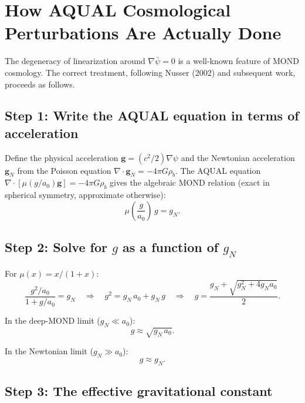 \documentclass[11pt]{article}
\newcommand{\aM}{a_0}
\begin{document}
\section{How AQUAL Cosmological Perturbations Are Actually Done}

The degeneracy of linearization around $\nabla\bar\psi = 0$ is a
well-known feature of MOND cosmology. The correct treatment, following
Nusser (2002) and subsequent work, proceeds as follows.

\subsection{Step 1: Write the AQUAL equation in terms of acceleration}

Define the physical acceleration $\mathbf{g} = (c^2/2)\nabla\psi$
and the Newtonian acceleration $\mathbf{g}_N$ from the Poisson equation
$\nabla\cdot\mathbf{g}_N = -4\pi G\rho_b$. The AQUAL equation
$\nabla\cdot[\mu(g/\aM)\mathbf{g}] = -4\pi G\rho_b$ gives the
algebraic MOND relation (exact in spherical symmetry, approximate
otherwise):
\begin{equation}
\mu\!\left(\frac{g}{\aM}\right)\,g = g_N.
\label{eq:MOND-algebraic}
\end{equation}

\subsection{Step 2: Solve for $g$ as a function of $g_N$}

For $\mu(x) = x/(1+x)$:
\begin{equation}
\frac{g^2/\aM}{1 + g/\aM} = g_N
\quad\Longrightarrow\quad
g^2 = g_N\,\aM + g_N\,g
\quad\Longrightarrow\quad
g = \frac{g_N + \sqrt{g_N^2 + 4g_N\aM}}{2}.
\label{eq:g-of-gN}
\end{equation}

In the deep-MOND limit ($g_N \ll \aM$):
\begin{equation}
g \approx \sqrt{g_N\,\aM}.
\label{eq:deep-MOND-g}
\end{equation}

In the Newtonian limit ($g_N \gg \aM$):
\begin{equation}
g \approx g_N.
\end{equation}

\subsection{Step 3: The effective gravitational constant}
\end{document}
